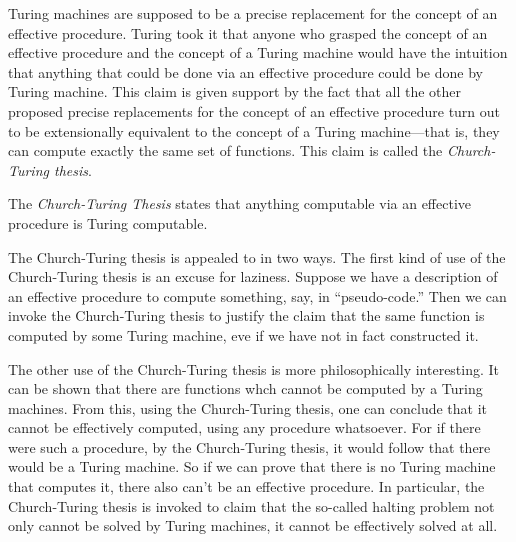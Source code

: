 \documentclass[../../../include/open-logic-section]{subfiles}
\begin{document}

Turing machines are supposed to be a precise replacement for the
concept of an effective procedure. Turing took it that anyone who
grasped the concept of an effective procedure and the concept of a
Turing machine would have the intuition that anything that could be
done via an effective procedure could be done by Turing machine. This
claim is given support by the fact that all the other proposed precise
replacements for the concept of an effective procedure turn out to be
extensionally equivalent to the concept of a Turing machine---that is,
they can compute exactly the same set of functions. This claim is
called the \emph{Church-Turing thesis}.

\begin{defn}
The \emph{Church-Turing Thesis} states that anything computable via 
an effective procedure is Turing computable.
\end{defn}

The Church-Turing thesis is appealed to in two ways.  The first kind
of use of the Church-Turing thesis is an excuse for laziness.  Suppose
we have a description of an effective procedure to compute something,
say, in ``pseudo-code.''  Then we can invoke the Church-Turing thesis
to justify the claim that the same function is computed by some Turing
machine, eve if we have not in fact constructed it.

The other use of the Church-Turing thesis is more philosophically
interesting.  It can be shown that there are functions whch cannot be
computed by a Turing machines.  From this, using the Church-Turing
thesis, one can conclude that it cannot be effectively computed, using
any procedure whatsoever.  For if there were such a procedure, by the
Church-Turing thesis, it would follow that there would be a Turing
machine.  So if we can prove that there is no Turing machine that
computes it, there also can't be an effective procedure.  In
particular, the Church-Turing thesis is invoked to claim that the
so-called halting problem not only cannot be solved by Turing
machines, it cannot be effectively solved at all.
\end{document}
